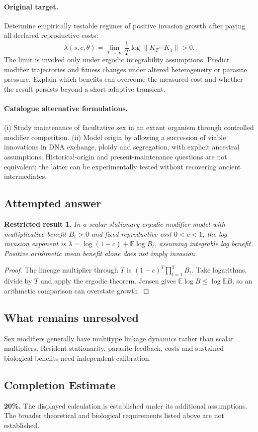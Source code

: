 \documentclass[11pt]{article}
\newcommand{\E}{\mathbb E}
\providecommand{\E}{\mathbb E}
\newtheorem{attemptresult}{Restricted result}[section]
\begin{document}
\paragraph{Original target.}
Determine empirically testable regimes of positive invasion growth after paying all declared reproductive costs:
\[
\lambda(s,c,\theta)=\lim_{T\to\infty}\frac1T\log\|K_T\cdots K_1\|>0.
\]
The limit is invoked only under ergodic integrability assumptions. Predict modifier trajectories and fitness changes under altered heterogeneity or parasite pressure. Explain which benefits can overcome the measured cost and whether the result persists beyond a short adaptive transient.
\paragraph{Catalogue alternative formulations.}
(i) Study maintenance of facultative sex in an extant organism through controlled modifier competition. (ii) Model origin by allowing a succession of viable innovations in DNA exchange, ploidy and segregation, with explicit ancestral assumptions. Historical-origin and present-maintenance questions are not equivalent; the latter can be experimentally tested without recovering ancient intermediates.
\subsection{Attempted answer}
\begin{attemptresult}
In a scalar stationary ergodic modifier model with multiplicative benefit $B_t>0$ and fixed reproductive cost $0<c<1$, the log invasion exponent is $\lambda=\log(1-c)+\E\log B_t$, assuming integrable log benefit. Positive arithmetic mean benefit alone does not imply invasion.
\end{attemptresult}
\begin{proof}
The lineage multiplier through $T$ is $(1-c)^T\prod_{t=1}^TB_t$. Take logarithms, divide by $T$ and apply the ergodic theorem. Jensen gives $\E\log B\leq\log\E B$, so an arithmetic comparison can overstate growth.
\end{proof}
\subsection{What remains unresolved}
Sex modifiers generally have multitype linkage dynamics rather than scalar multipliers. Resident stationarity, parasite feedback, costs and sustained biological benefits need independent calibration.
\subsection{Completion Estimate}
\textbf{20\%.} The displayed calculation is established under its additional assumptions. The broader theoretical and biological requirements listed above are not established.
\end{document}

